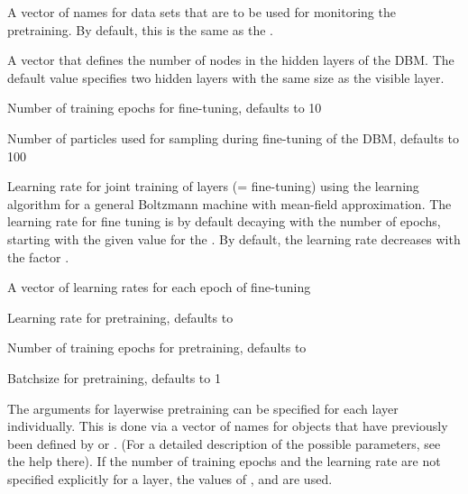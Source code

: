 \begin{Arguments}
\begin{ldescription}
\item[\code{monitoringdatapretraining}] A vector of names for data sets that are to be used for
monitoring the pretraining. By default, this is the same as the .

\item[\code{nhiddens}] A vector that defines the number of nodes in the hidden layers of
the DBM. The default value specifies two hidden layers with the same size
as the visible layer.

\item[\code{epochs}] Number of training epochs for fine-tuning, defaults to 10

\item[\code{nparticles}] Number of particles used for sampling during fine-tuning of the
DBM, defaults to 100

\item[\code{learningrate}] Learning rate for joint training of layers (= fine-tuning)
using the learning algorithm for a general Boltzmann machine
with mean-field approximation.
The learning rate for fine tuning is by default decaying with the number of epochs,
starting with the given value for the .
By default, the learning rate decreases with the factor .

\item[\code{learningrates}] A vector of learning rates for each epoch of fine-tuning

\item[\code{learningratepretraining}] Learning rate for pretraining,
defaults to 

\item[\code{epochspretraining}] Number of training epochs for pretraining,
defaults to 

\item[\code{batchsizepretraining}] Batchsize for pretraining, defaults to 1

\item[\code{pretraining}] The arguments for layerwise pretraining
can be specified for each layer individually.
This is done via a vector of names for objects that have previously been defined
by  or .
(For a detailed description of the possible parameters,
see the help there).
If the number of training epochs and the learning rate are not specified
explicitly for a layer, the values of ,
 and  are used.
\end{ldescription}
\end{Arguments}
